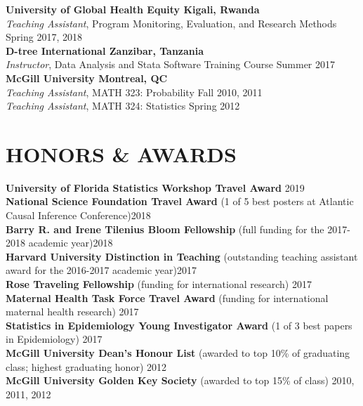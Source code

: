 \documentclass[12pt]{article}
\begin{document}
\textbf{University of Global Health Equity \hfill \hfill Kigali, Rwanda} \\
\textit{Teaching Assistant}, Program Monitoring, Evaluation, and Research Methods  \hfill \hfill Spring 2017, 2018 \\

\textbf{D-tree International \hfill \hfill Zanzibar, Tanzania}\\
\textit{Instructor}, Data Analysis and Stata Software Training Course \hfill \hfill Summer 2017  \\

\textbf{McGill University \hfill \hfill Montreal, QC}\\
\textit{Teaching Assistant}, MATH 323: Probability \hfill \hfill Fall 2010, 2011 \\
\textit{Teaching Assistant}, MATH 324: Statistics \hfill \hfill Spring 2012 

\vspace{-.1cm}
\section*{\textbf{{\large H}{ONORS} {\large \&} {\large A}{WARDS}}}
\textbf{University of Florida Statistics Workshop Travel Award} \hfill \hfill 2019 \\
\textbf{National Science Foundation Travel Award} {\footnotesize (1 of 5 best posters at Atlantic Causal Inference Conference)}\hfill \hfill	2018 \\
\textbf{Barry R. and Irene Tilenius Bloom Fellowship} {\footnotesize (full funding for the 2017-2018 academic year)}\hfill \hfill	2018 \\
\textbf{Harvard University Distinction in Teaching} {\footnotesize (outstanding teaching assistant award for the 2016-2017 academic year)}\hfill \hfill 2017 \\
\textbf{Rose Traveling Fellowship} {\footnotesize (funding for international research)} \hfill \hfill	2017 \\
\textbf{Maternal Health Task Force Travel Award} {\footnotesize (funding for international maternal health research)} \hfill \hfill	2017 \\
\textbf{Statistics in Epidemiology Young Investigator Award} {\footnotesize (1 of 3 best papers in Epidemiology)}  \hfill \hfill	2017 \\
\textbf{McGill University Dean's Honour List} {\footnotesize (awarded to top 10\% of graduating class; highest graduating honor)}  \hfill \hfill	2012 \\
\textbf{McGill University Golden Key Society} {\footnotesize (awarded to top 15\% of class)}  \hfill \hfill2010, 2011, 2012 
\end{document}

